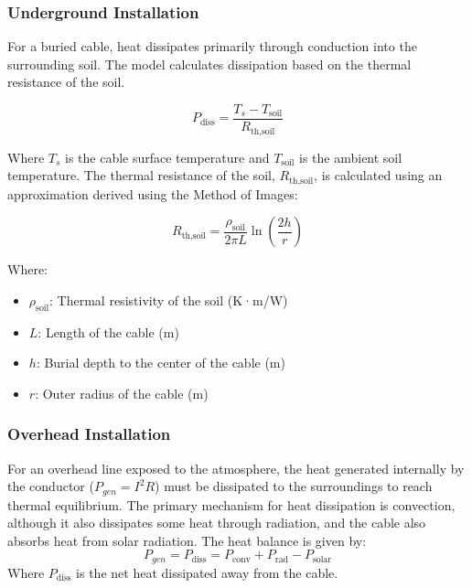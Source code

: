 \documentclass[12pt, a4paper]{article}
\begin{document}
\subsubsection{Underground Installation}
For a buried cable, heat dissipates primarily through conduction into the surrounding soil. The model calculates dissipation based on the thermal resistance of the soil.

\begin{equation}
P_{\text{diss}} = \frac{T_s - T_{\text{soil}}}{R_{\text{th,soil}}}
\end{equation}

Where $T_s$ is the cable surface temperature and $T_{\text{soil}}$ is the ambient soil temperature. The thermal resistance of the soil, $R_{\text{th,soil}}$, is calculated using an approximation derived using the Method of Images:

\begin{equation}
R_{\text{th,soil}} = \frac{\rho_{\text{soil}}}{2 \pi L} \ln\left( \frac{2h}{r} \right)
\end{equation}

Where:
\begin{itemize}
    \item $\rho_{\text{soil}}$: Thermal resistivity of the soil (K·m/W)
    \item $L$: Length of the cable (m)
    \item $h$: Burial depth to the center of the cable (m)
    \item $r$: Outer radius of the cable (m)
\end{itemize}

\subsubsection{Overhead Installation}
For an overhead line exposed to the atmosphere, the heat generated internally by the conductor ($P_{gen} = I^2 R$) must be dissipated to the surroundings to reach thermal equilibrium. The primary mechanism for heat dissipation is convection, although it also dissipates some heat through radiation, and the cable also absorbs heat from solar radiation. The heat balance is given by:
\begin{equation}
P_{gen} = P_{\text{diss}} = P_{\text{conv}} + P_{\text{rad}} - P_{\text{solar}}
\end{equation}
Where $P_{\text{diss}}$ is the net heat dissipated away from the cable.
\end{document}
